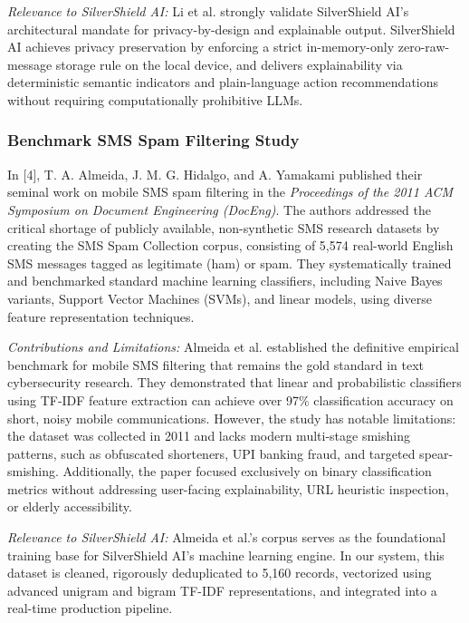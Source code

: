 \documentclass[conference]{IEEEtran}
\begin{document}
\textit{Relevance to SilverShield AI:} Li et al. strongly validate SilverShield AI's architectural mandate for privacy-by-design and explainable output. SilverShield AI achieves privacy preservation by enforcing a strict in-memory-only zero-raw-message storage rule on the local device, and delivers explainability via deterministic semantic indicators and plain-language action recommendations without requiring computationally prohibitive LLMs.

\subsubsection{Benchmark SMS Spam Filtering Study}
In [4], T. A. Almeida, J. M. G. Hidalgo, and A. Yamakami published their seminal work on mobile SMS spam filtering in the \textit{Proceedings of the 2011 ACM Symposium on Document Engineering (DocEng)}. The authors addressed the critical shortage of publicly available, non-synthetic SMS research datasets by creating the SMS Spam Collection corpus, consisting of 5,574 real-world English SMS messages tagged as legitimate (ham) or spam. They systematically trained and benchmarked standard machine learning classifiers, including Naive Bayes variants, Support Vector Machines (SVMs), and linear models, using diverse feature representation techniques.

\textit{Contributions and Limitations:} Almeida et al. established the definitive empirical benchmark for mobile SMS filtering that remains the gold standard in text cybersecurity research. They demonstrated that linear and probabilistic classifiers using TF-IDF feature extraction can achieve over 97\% classification accuracy on short, noisy mobile communications. However, the study has notable limitations: the dataset was collected in 2011 and lacks modern multi-stage smishing patterns, such as obfuscated shorteners, UPI banking fraud, and targeted spear-smishing. Additionally, the paper focused exclusively on binary classification metrics without addressing user-facing explainability, URL heuristic inspection, or elderly accessibility.

\textit{Relevance to SilverShield AI:} Almeida et al.'s corpus serves as the foundational training base for SilverShield AI's machine learning engine. In our system, this dataset is cleaned, rigorously deduplicated to 5,160 records, vectorized using advanced unigram and bigram TF-IDF representations, and integrated into a real-time production pipeline.
\end{document}
